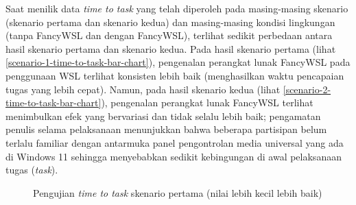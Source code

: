 Saat menilik data \textit{time to task} yang telah diperoleh pada masing-masing skenario (skenario pertama dan skenario kedua) dan masing-masing kondisi lingkungan (tanpa FancyWSL dan dengan FancyWSL), terlihat sedikit perbedaan antara hasil skenario pertama dan skenario kedua. Pada hasil skenario pertama (lihat \autoref{scenario-1-time-to-task-bar-chart}), pengenalan perangkat lunak FancyWSL pada penggunaan WSL terlihat konsisten lebih baik (menghasilkan waktu pencapaian tugas yang lebih cepat). Namun, pada hasil skenario kedua (lihat \autoref{scenario-2-time-to-task-bar-chart}), pengenalan perangkat lunak FancyWSL terlihat menimbulkan efek yang bervariasi dan tidak selalu lebih baik; pengamatan penulis selama pelaksanaan menunjukkan bahwa beberapa partisipan belum terlalu familiar dengan antarmuka panel pengontrolan media universal yang ada di Windows 11 sehingga menyebabkan sedikit kebingungan di awal pelaksanaan tugas (\textit{task}).

\begin{figure}
    \centering
    \caption{Pengujian \textit{time to task} skenario pertama (nilai lebih kecil lebih baik)}
    \label{scenario-1-time-to-task-bar-chart}
\end{figure}

